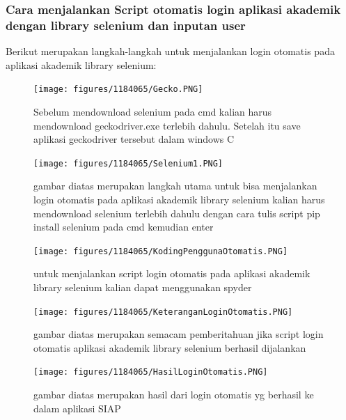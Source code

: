 \subsubsection{Cara menjalankan Script otomatis login aplikasi akademik dengan library selenium dan inputan user}
Berikut merupakan langkah-langkah untuk menjalankan login otomatis pada aplikasi akademik library selenium:
\begin{figure}[H]
		\texttt{[image: figures/1184065/Gecko.PNG]}
		\centering
		\caption{Sebelum mendownload selenium pada cmd kalian harus mendownload geckodriver.exe terlebih dahulu. Setelah itu save aplikasi geckodriver tersebut dalam windows C }
	\end{figure}
\begin{figure}[H]
		\texttt{[image: figures/1184065/Selenium1.PNG]}
		\centering
		\caption{gambar diatas merupakan langkah utama untuk bisa menjalankan login otomatis pada aplikasi akademik library selenium kalian harus mendownload selenium terlebih dahulu dengan cara tulis script pip install selenium pada cmd kemudian enter}
	\end{figure}
\begin{figure}[H]
		\texttt{[image: figures/1184065/KodingPenggunaOtomatis.PNG]}
		\centering
		\caption{untuk menjalankan script login otomatis pada aplikasi akademik library selenium kalian dapat menggunakan spyder }
	\end{figure}
	\begin{figure}[H]
		\texttt{[image: figures/1184065/KeteranganLoginOtomatis.PNG]}
		\centering
		\caption{gambar diatas merupakan semacam pemberitahuan jika script login otomatis aplikasi akademik library selenium berhasil dijalankan}
	\end{figure}
	\begin{figure}[H]
		\texttt{[image: figures/1184065/HasilLoginOtomatis.PNG]}
		\centering
		\caption{gambar diatas merupakan hasil dari login otomatis yg berhasil ke dalam aplikasi SIAP }
	\end{figure}
